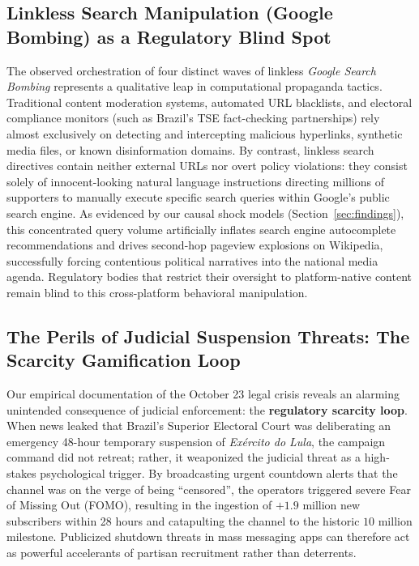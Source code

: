 \documentclass[preprint,12pt]{elsarticle}
\begin{document}
\subsection{Linkless Search Manipulation (Google Bombing) as a Regulatory Blind Spot}
The observed orchestration of four distinct waves of linkless \textit{Google Search Bombing} represents a qualitative leap in computational propaganda tactics. Traditional content moderation systems, automated URL blacklists, and electoral compliance monitors (such as Brazil's TSE fact-checking partnerships) rely almost exclusively on detecting and intercepting malicious hyperlinks, synthetic media files, or known disinformation domains. By contrast, linkless search directives contain neither external URLs nor overt policy violations: they consist solely of innocent-looking natural language instructions directing millions of supporters to manually execute specific search queries within Google's public search engine. As evidenced by our causal shock models (Section~\ref{sec:findings}), this concentrated query volume artificially inflates search engine autocomplete recommendations and drives second-hop pageview explosions on Wikipedia, successfully forcing contentious political narratives into the national media agenda. Regulatory bodies that restrict their oversight to platform-native content remain blind to this cross-platform behavioral manipulation.

\subsection{The Perils of Judicial Suspension Threats: The Scarcity Gamification Loop}
Our empirical documentation of the October 23 legal crisis reveals an alarming unintended consequence of judicial enforcement: the \textbf{regulatory scarcity loop}. When news leaked that Brazil's Superior Electoral Court was deliberating an emergency 48-hour temporary suspension of \textit{Exército do Lula}, the campaign command did not retreat; rather, it weaponized the judicial threat as a high-stakes psychological trigger. By broadcasting urgent countdown alerts that the channel was on the verge of being ``censored'', the operators triggered severe Fear of Missing Out (FOMO), resulting in the ingestion of $+1.9\text{ million}$ new subscribers within 28 hours and catapulting the channel to the historic $10\text{ million}$ milestone. Publicized shutdown threats in mass messaging apps can therefore act as powerful accelerants of partisan recruitment rather than deterrents.
\end{document}
